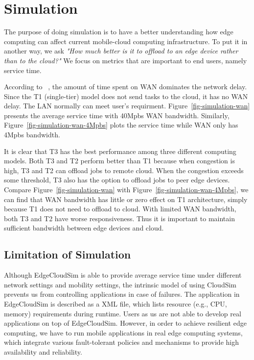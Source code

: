 \section{Simulation}
\label{sec:simulation}



The purpose of doing simulation is to have a better understanding how edge computing can
affect current mobile-cloud computing infrastructure. To put it in another way,
we ask {\em "How much better is it to offload to an edge device rather than to the cloud?"}
We focus on metrics that are important to end users, namely service time.

According to ~\cite{edgecloudsim}, the amount of time spent on WAN dominates the network delay.
Since the T1 (single-tier) model does not send tasks to the cloud, it has no WAN delay. The LAN
normally can meet user's requirment.
Figure~\ref{fig-simulation-wan} presents the average service time with 40Mpbs WAN bandwidth.
Similarly, Figure~\ref{fig-simulation-wan-4Mpbs} plots the service time while WAN only has 4Mpbs bandwidth.

It is clear that T3 has the best performance among three different computing models. Both T3 and T2 perform better
than T1 because when congestion is high, T3 and T2 can offload jobs to remote cloud. When the congestion
exceeds some threshold, T3 also has the option to offload jobs to peer edge devices.
Compare Figure~\ref{fig-simulation-wan} with Figure~\ref{fig-simulation-wan-4Mpbs}, we can find
that WAN bandwidth has little or zero effect on T1 architecture, simply because T1 does not need to offload to cloud.
With limited WAN bandwidth, both T3 and T2 have worse responsiveness. Thus it is important to maintain sufficient
bandwidth between edge devices and cloud.

\subsection{Limitation of Simulation}
Although EdgeCloudSim is able to provide average service time under different network settings and mobility settings,
the intrinsic model of using CloudSim prevents us from controlling applications in case of failures. The application
in EdgeCloudSim is described as a XML file, which lists resource (e.g., CPU, memory) requirements during runtime.
Users as us are not able to develop real applications on top of EdgeCloudSim. However, in order to achieve resilient
edge computing, we have to run mobile applications in real edge computing systems, which integrate various
fault-tolerant policies and mechanisms to provide high availability and reliability.
